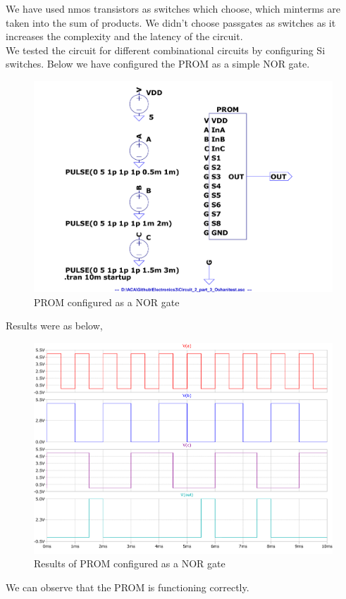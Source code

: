 \documentclass[a4paper,11pt]{article}%
\begin{document}
We have used nmos transistors as switches which choose, which minterms are taken into the sum of products. We didn’t choose passgates as switches as it increases the complexity and the latency of the circuit.\\ 

We tested the circuit for different combinational circuits by configuring Si switches. Below we have configured the PROM as a simple NOR gate.\\


\begin{figure}[H]
	\centering
	\includegraphics[scale=0.4]{figures/Figure335.pdf}
	\caption{PROM configured as a NOR gate}
\end{figure}

Results were as below,
\begin{figure}[H]
	\centering
	\includegraphics[scale=0.5]{figures/Figure336.pdf}
	\caption{Results of PROM configured as a NOR gate}
\end{figure}

We can observe that the PROM is functioning correctly.

\pagebreak
{\scriptsize


}
\end{document}

